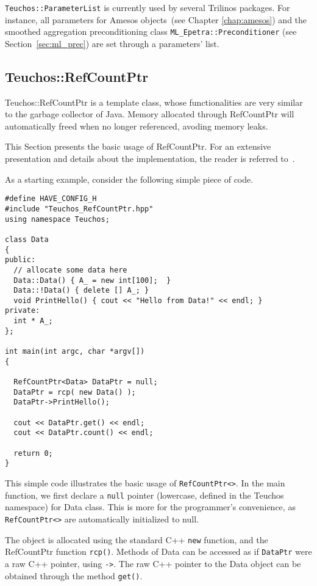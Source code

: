 \begin{remark}
  \verb!Teuchos::ParameterList! is currently used by several Trilinos
  packages. For instance, all parameters for Amesos objects~(see Chapter
  \ref{chap:amesos}) and the smoothed aggregation preconditioning class
  \verb!ML_Epetra::Preconditioner! (see Section~\ref{sec:ml_prec}) are set
  through a parameters' list.
\end{remark}



\subsection{Teuchos::RefCountPtr}
\label{sec:teuchos:RefCountPtr}

Teuchos::RefCountPtr is a template class, whose functionalities are very
similar to the garbage collector of Java. Memory allocated through
RefCountPtr will automatically freed when no longer referenced, avoding
memory leaks.

This Section presents the basic usage of RefCountPtr. For an extensive
presentation and details about the implementation, the reader is
referred to~\cite{RefCountPtr-guide}. 

As a starting example, consider the following simple piece of
code. 
\begin{verbatim}
#define HAVE_CONFIG_H
#include "Teuchos_RefCountPtr.hpp"
using namespace Teuchos;

class Data 
{
public:
  // allocate some data here
  Data::Data() { A_ = new int[100];  }
  Data::!Data() { delete [] A_; }
  void PrintHello() { cout << "Hello from Data!" << endl; }
private:
  int * A_;
};

int main(int argc, char *argv[]) 
{

  RefCountPtr<Data> DataPtr = null;
  DataPtr = rcp( new Data() );
  DataPtr->PrintHello();

  cout << DataPtr.get() << endl;
  cout << DataPtr.count() << endl;

  return 0;
}
\end{verbatim}
This simple code illustrates the basic usage of \verb!RefCountPtr<>!. In
the main function, we first declare a \verb!null! pointer (lowercase,
defined in the Teuchos namespace) for Data class. This is more for the
programmer's convenience, as \verb!RefCountPtr<>! are automatically
initialized to null.

The object is allocated using the standard C++ \verb!new! function, and
the RefCountPtr function \verb!rcp()!.  Methods of Data can be accessed
as if \verb!DataPtr! were a raw C++ pointer, using \verb!->!.  The raw
C++ pointer to the Data object can be obtained through the method
\verb!get()!.

